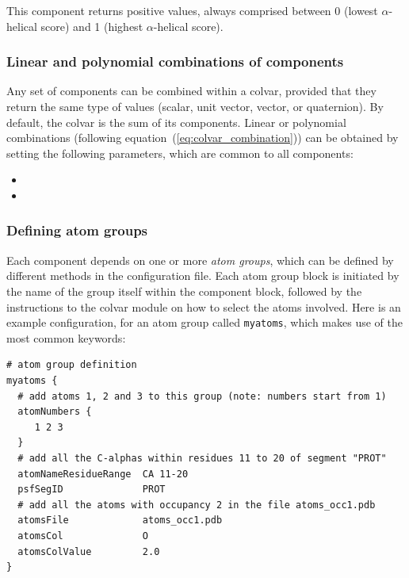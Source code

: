 This component returns positive values, always comprised between 0
(lowest $\alpha$-helical score) and 1 (highest $\alpha$-helical
score).



\subsubsection{Linear and polynomial combinations of components}
Any set of components can be combined within a colvar,
provided that they return
the same type of values (scalar, unit vector, vector, or quaternion).
By default, the colvar is the sum of its components.
Linear or polynomial combinations (following equation~(\ref{eq:colvar_combination}))
can be obtained by setting the following
parameters, which are common to all components:
\begin{itemize}

\item %

\item %

\end{itemize}


\subsubsection{Defining atom groups}
\label{sec:colvar_atom_groups}
Each component depends on one or more \emph{atom groups}, which can be
defined by different methods in the configuration file.  Each atom
group block is initiated by the name of the group itself within the
component block, followed by the instructions to the colvar module on
how to select the atoms involved.  Here is an example configuration,
for an atom group called \texttt{myatoms}, which makes use of the most
common keywords:
\begin{verbatim}
# atom group definition
myatoms {
  # add atoms 1, 2 and 3 to this group (note: numbers start from 1)
  atomNumbers {
     1 2 3
  }
  # add all the C-alphas within residues 11 to 20 of segment "PROT"
  atomNameResidueRange  CA 11-20
  psfSegID              PROT
  # add all the atoms with occupancy 2 in the file atoms_occ1.pdb
  atomsFile             atoms_occ1.pdb
  atomsCol              O
  atomsColValue         2.0
}
\end{verbatim}

